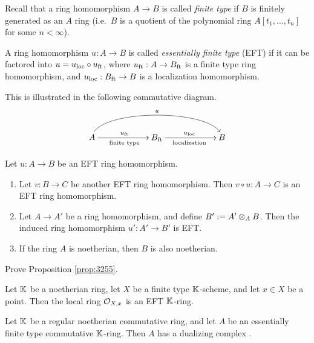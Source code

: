 Recall that a ring homomorphism $A \to B$ is called {\em finite type} if 
$B$ is finitely generated as an $A$ ring (i.e.\ $B$ is a quotient of the 
polynomial ring $A[t_1, \ldots, t_n]$ for some $n < \infty$). 

\begin{dfn} \label{dfn:3211}
A ring homomorphism $u : A \to B$ is called {\em essentially finite type}
(EFT) if it can be factored into $u = u_{\mathrm{loc}} \circ u_{\mathrm{ft}}$, where 
$u_{\mathrm{ft}} : A \to B_{\mathrm{ft}}$ is a finite type ring homomorphism, and 
$u_{\mathrm{loc}} : B_{\mathrm{ft}} \to B$ is a localization homomorphism.
\end{dfn}

This is illustrated in the following commutative diagram. 
\[ \UseTips \xymatrix @C=14ex @R=6ex {
A
\ar[r]_{\tup{finite type}}^{u_{\mrm{ft}}}
\ar@(u,u)[rr]^{u}
&
B_{\mrm{ft}}
\ar[r]_{\tup{localization}}^{u_{\mrm{loc}}}
&
B 
} \]

\begin{prop} \label{prop:3255}
Let $u : A \to  B$ be an EFT ring homomorphism.
\begin{enumerate}
\item Let $v : B \to C$ be another EFT ring homomorphism. Then 
$v \circ u : A \to C$ is an EFT ring homomorphism.

\item Let $A \to A'$ be a ring homomorphism, and define 
$B' := A' \otimes_A B$. Then the induced ring homomorphism 
$u' : A' \to B'$ is EFT. 

\item If the ring $A$ is noetherian, then $B$ is also noetherian. 
\end{enumerate}
\end{prop}

\begin{exer} \label{exer:3256}
Prove Proposition \ref{prop:3255}.
\end{exer}

\begin{exa} \label{exa:3255}
Let $\mathbb{K}$ be a noetherian ring, let $X$ be a finite type $\mathbb{K}$-scheme, and let 
$x \in X$ be a point. Then the local ring $\mathcal{O}_{X, x}$ is an EFT $\mathbb{K}$-ring. 
\end{exa}

\begin{thm} \label{thm:2170}
Let $\mathbb{K}$ be a regular noetherian commutative ring, and let $A$ be an 
essentially finite type commutative $\mathbb{K}$-ring. Then $A$ has a dualizing 
complex%
. 
\end{thm}

